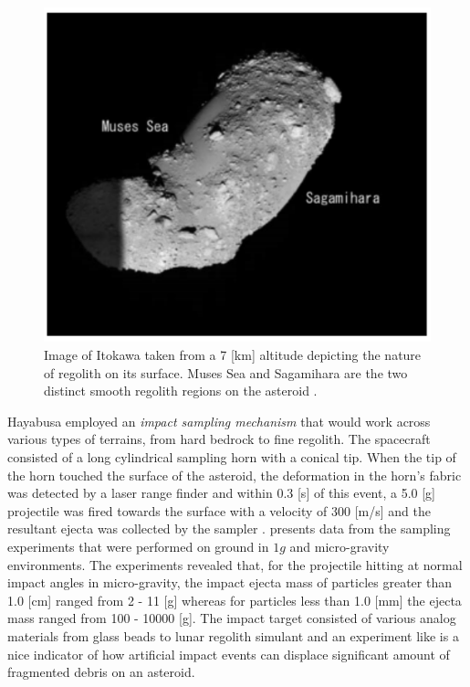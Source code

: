 \begin{figure}[htb]
\centering
\captionsetup{justification=centering}
\includegraphics[width=\linewidth, height=0.5\textheight, keepaspectratio=true]{itokawa_regolith.pdf}
\caption{Image of Itokawa taken from a 7 [km] altitude depicting the nature of regolith on its surface. Muses Sea and Sagamihara are the two distinct smooth regolith regions on the asteroid \parencite{fujiwara2006ItokawaHayabusa}.}
\label{fig:itokawa_regolith}
\end{figure}
\FloatBarrier
Hayabusa employed an \textit{impact sampling mechanism} that would work across various types of terrains, from hard bedrock to fine regolith. The spacecraft consisted of a long cylindrical sampling horn with a conical tip. When the tip of the horn touched the surface of the asteroid, the deformation in the horn's fabric was detected by a laser range finder and within 0.3 [s] of this event, a 5.0 [g] projectile was fired towards the surface with a velocity of 300 [m/s] and the resultant ejecta was collected by the sampler \parencite{yano2004sampling}. \cite{yanoHayabusaTouchdown} presents data from the sampling experiments that were performed on ground in $1g$ and micro-gravity environments. The experiments revealed that, for the projectile hitting at normal impact angles in micro-gravity, the impact ejecta mass of particles greater than 1.0 [cm] ranged from 2 - 11 [g] whereas for particles less than 1.0 [mm] the ejecta mass ranged from 100 - 10000 [g]. The impact target consisted of various analog materials from glass beads to lunar regolith simulant and an experiment like is a nice indicator of how artificial impact events can displace significant amount of fragmented debris on an asteroid.

